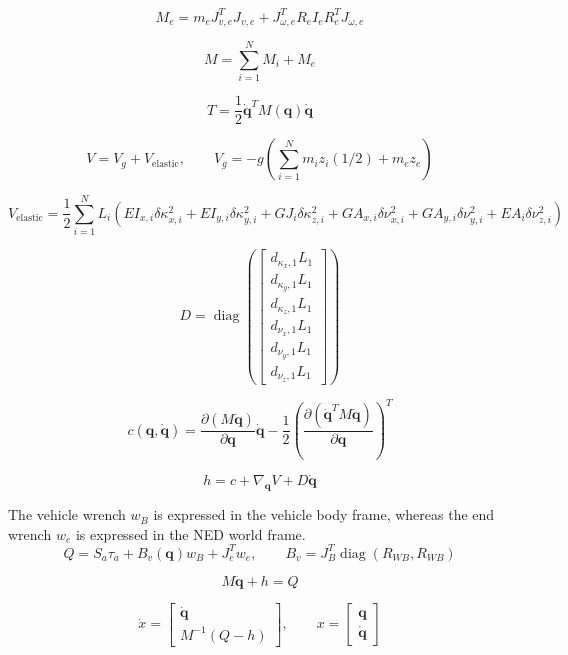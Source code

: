 \documentclass[11pt]{article}
\begin{document}
\begin{equation}
M_e=m_eJ_{v,e}^{T}J_{v,e}+J_{\omega,e}^{T}R_eI_eR_e^TJ_{\omega,e}
\end{equation}

\begin{equation}
M=\sum_{i=1}^{N}M_i+M_e\label{eq:mass-assembly}
\end{equation}

\begin{equation}
T=\frac12\dot{\boldsymbol q}^{T}M(\boldsymbol q)\dot{\boldsymbol q}
\end{equation}

\begin{equation}
V=V_g+V_{\mathrm{elastic}},\qquad V_g=-g\!\left(\sum_{i=1}^{N}m_i z_i(1/2)+m_ez_e\right)
\end{equation}

\begin{equation}
V_{\mathrm{elastic}}=\frac12\sum_{i=1}^{N}L_i\left(EI_{x,i}\delta\kappa_{x,i}^2+EI_{y,i}\delta\kappa_{y,i}^2+GJ_i\delta\kappa_{z,i}^2+GA_{x,i}\delta\nu_{x,i}^2+GA_{y,i}\delta\nu_{y,i}^2+EA_i\delta\nu_{z,i}^2\right)
\end{equation}

\begin{equation}
D=\operatorname{diag}\!\left(\begin{bmatrix}d_{\kappa_x,1} L_{1}\\d_{\kappa_y,1} L_{1}\\d_{\kappa_z,1} L_{1}\\d_{\nu_x,1} L_{1}\\d_{\nu_y,1} L_{1}\\d_{\nu_z,1} L_{1}\end{bmatrix}\right)
\end{equation}

\begin{equation}
c(\boldsymbol q,\dot{\boldsymbol q})=\frac{\partial(M\dot{\boldsymbol q})}{\partial\boldsymbol q}\dot{\boldsymbol q}-\frac12\left(\frac{\partial(\dot{\boldsymbol q}^{T}M\dot{\boldsymbol q})}{\partial\boldsymbol q}\right)^T
\end{equation}

\begin{equation}
h=c+\nabla_{\boldsymbol q}V+D\dot{\boldsymbol q}
\end{equation}

The vehicle wrench $w_B$ is expressed in the vehicle body frame, whereas the end wrench $w_e$ is expressed in the NED world frame.
\begin{equation}
Q=S_a\tau_a+B_v(\boldsymbol q)w_B+J_e^Tw_e,\qquad B_v=J_B^T\operatorname{diag}(R_{WB},R_{WB})
\end{equation}

\begin{equation}
M\ddot{\boldsymbol q}+h=Q\label{eq:dynamics}
\end{equation}

\begin{equation}
\dot x=\begin{bmatrix}\dot{\boldsymbol q}\\M^{-1}(Q-h)\end{bmatrix},\qquad x=\begin{bmatrix}\boldsymbol q\\\dot{\boldsymbol q}\end{bmatrix}
\end{equation}
\end{document}

